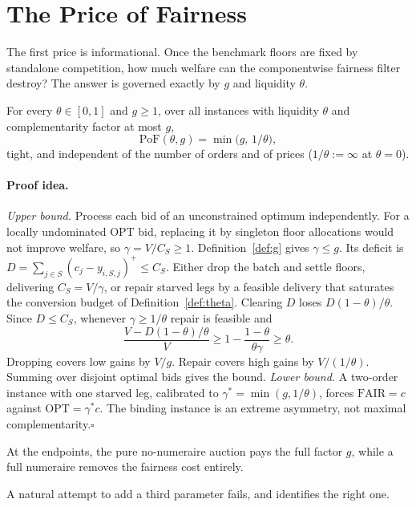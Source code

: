 \documentclass{llncs}
\newcommand{\OPT}{\mathrm{OPT}}
\newcommand{\FAIR}{\mathrm{FAIR}}
\newcommand{\PoF}{\mathrm{PoF}}
\begin{document}
\section{The Price of Fairness}\label{sec:pof}

The first price is informational. Once the benchmark floors are fixed by
standalone competition, how much welfare can the componentwise fairness
filter destroy?  The answer is governed exactly by $g$ and liquidity
$\theta$.

\begin{theorem}\label{thm:pof}
For every $\theta\in[0,1]$ and $g\ge1$, over all instances with liquidity
$\theta$ and complementarity factor at most $g$,
\[
\PoF(\theta,g)=\min\!\big(g,\,1/\theta\big),
\]
tight, and independent of the number of orders and of prices
($1/\theta:=\infty$ at $\theta=0$).
\end{theorem}

\paragraph{Proof idea.}
\emph{Upper bound.} Process each bid of an unconstrained optimum
independently. For a locally undominated OPT bid, replacing it by
singleton floor allocations would not improve welfare, so
$\gamma=V/C_S\ge1$. Definition~\ref{def:g} gives $\gamma\le g$. Its
deficit is $D=\sum_{j\in S}(c_j-y_{i,S,j})^+\le C_S$. Either drop the batch and settle
floors, delivering $C_S=V/\gamma$, or repair starved legs by a feasible
delivery that saturates the conversion budget of
Definition~\ref{def:theta}. Clearing $D$ loses $D(1-\theta)/\theta$.
Since $D\le C_S$, whenever $\gamma\ge1/\theta$ repair is feasible and
\[
  \frac{V-D(1-\theta)/\theta}{V}
  \ge 1-\frac{1-\theta}{\theta\gamma}
  \ge \theta .
\]
Dropping covers low gains by $V/g$. Repair covers high gains by
$V/(1/\theta)$. Summing over disjoint optimal bids gives the bound.
\emph{Lower bound.} A two-order instance with one starved leg, calibrated
to $\gamma^\ast=\min(g,1/\theta)$, forces
$\FAIR=c$ against $\OPT=\gamma^\ast c$. The binding instance is an
extreme asymmetry, not maximal complementarity.\hfill$\square$

\begin{corollary}[Dichotomy]\label{cor:dichotomy}
At the endpoints, the pure no-numeraire auction pays the full factor
$g$, while a full numeraire removes the fairness cost entirely.
\end{corollary}

A natural attempt to add a third parameter fails, and identifies the
right one.
\end{document}

